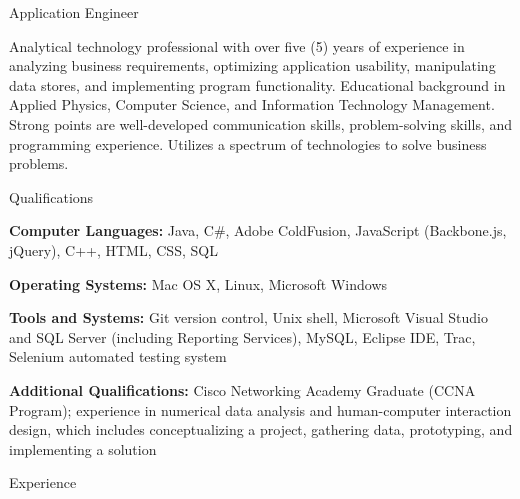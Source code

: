 



\begin{Large}\textsf{Application Engineer}\end{Large} \vspace{-2mm}

\begin{itemize1}
	\item Analytical technology professional with over five (5) years of experience in analyzing business requirements, optimizing application usability, manipulating data stores, and implementing program functionality.  Educational background in Applied Physics, Computer Science, and Information Technology Management. Strong points are well-developed communication skills, problem-solving skills, and programming experience. Utilizes a spectrum of technologies to solve business problems.
\end{itemize1}

\begin{Large}\textsf{Qualifications}\end{Large} \vspace{-2mm}

\begin{itemize1}
	\item \textbf{Computer Languages:} Java, C\#, Adobe ColdFusion, JavaScript (Backbone.js, jQuery), C++, HTML, CSS, SQL \vspace{2mm}
	\item \textbf{Operating Systems:} Mac OS X, Linux, Microsoft Windows \vspace{2mm}
	\item \textbf{Tools and Systems:} Git version control, Unix shell, Microsoft Visual Studio and SQL Server (including Reporting Services), MySQL, Eclipse IDE, Trac, Selenium automated testing system \vspace{2mm}
	\item \textbf{Additional Qualifications:} Cisco Networking Academy Graduate (CCNA Program); experience in numerical data analysis and human-computer interaction design, which includes conceptualizing a project, gathering data, prototyping, and implementing a solution
\end{itemize1}

\begin{Large}\textsf{Experience}\end{Large} \vspace{-2mm}

